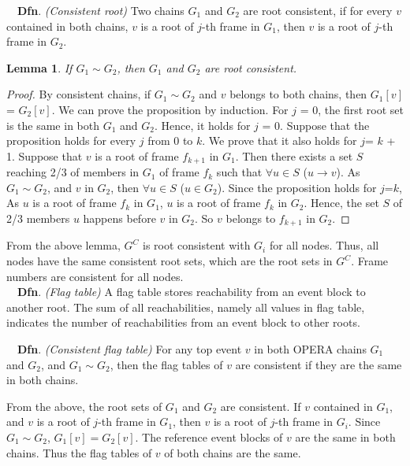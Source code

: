 \documentclass{article}
\newtheorem{lem}[thm]{Lemma}
\newcommand{\dfnn}[2]{$\quad$\textbf{Dfn}. \emph{(#1)} {#2}}
\newcommand{\hbefore}{\rightarrow}
\begin{document}
\dfnn{Consistent root}{Two chains $G_1$ and $G_2$ are root consistent, if for every $v$ contained in both chains, $v$ is a root of $j$-th frame in $G_1$, then $v$ is a root of $j$-th frame in $G_2$.}

\begin{lem}
If $G_1 \sim G_2$, then $G_1$ and $G_2$ are root consistent.
\end{lem}
\begin{proof}
By consistent chains, if $G_1 \sim G_2$ and $v$ belongs to both chains, then $G_1[v]$ = $G_2[v]$.
	We can prove the proposition by induction. For $j$ = 0, the first root set is the same in both $G_1$ and $G_2$. Hence, it holds for $j$ = 0. Suppose that the proposition holds for every $j$ from 0 to $k$. We prove that it also holds for $j$= $k$ + 1.
	 Suppose that $v$ is a root of frame $f_{k+1}$ in $G_1$. 
	Then there exists a set $S$ reaching 2/3 of members in $G_1$ of frame $f_k$ such that $\forall u \in S$ ($u\hbefore v$). As $G_1 \sim G_2$, and $v$ in $G_2$, then $\forall u \in S$ ($u \in G_2$). Since the proposition holds for $j$=$k$, 
	As $u$ is a root of frame $f_{k}$ in $G_1$, $u$ is a root of frame $f_k$ in $G_2$. Hence, the set $S$ of 2/3 members $u$ happens before $v$ in $G_2$. So $v$ belongs to $f_{k+1}$ in $G_2$.
\end{proof}
	
From the above lemma, $G^C$ is root consistent with $G_i$ for all nodes.
Thus, all nodes have the same consistent root sets, which are the root sets in $G^C$. Frame numbers are consistent for all nodes.\\

\dfnn{Flag table}{A flag table stores reachability from an event block to another root. The sum of all reachabilities, namely all values in flag table, indicates the number of reachabilities from an event block to other roots.}

\dfnn{Consistent flag table}{For any top event $v$ in both OPERA chains $G_1$ and $G_2$, and $G_1 \sim G_2$, then the flag tables of $v$ are consistent if they are the same in both chains.}

From the above, the root sets of $G_1$ and $G_2$ are consistent. If $v$ contained in $G_1$, and $v$ is a root of $j$-th frame in $G_1$, then $v$ is a root of $j$-th frame in $G_i$. Since $G_1 \sim G_2$, $G_1[v] = G_2[v]$. The reference event blocks of $v$ are the same in both chains. Thus the flag tables of $v$ of both chains are the same.\\
\end{document}
